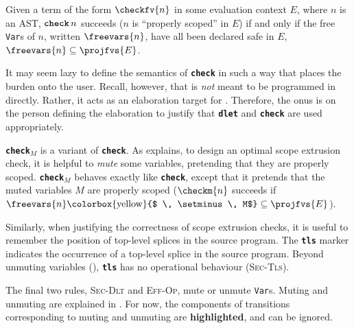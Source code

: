Given a term of the form $\checkfv{n}$ in some evaluation context $E$, where $n$ is an AST, $\textbf{\texttt{check}} \, n$ succeeds ($n$ is ``properly scoped'' in $E$) if and only if the free \texttt{Var}s of $n$, written $\freevars{n}$, have all been declared safe in $E$, $\freevars{n} \subseteq \projfvs{E}$. 

It may seem lazy to define the semantics of \textbf{\texttt{check}} in such a way that places the burden onto the user. Recall, however, that \coreLang{} is \textit{not} meant to be programmed in directly. Rather, it acts as an elaboration target for \sourceLang{}. Therefore, the onus is on the person defining the elaboration to justify that \textbf{\texttt{dlet}} and \textbf{\texttt{check}} are used appropriately. 

\textbf{\texttt{check}}$_M$ is a variant of \textbf{\texttt{check}}. As  explains, to design an optimal scope extrusion check, it is helpful to \textit{mute} some variables, pretending that they are properly scoped. \textbf{\texttt{check}}$_M$ behaves exactly like \textbf{\texttt{check}}, except that it pretends that the muted variables $M$ are properly scoped ($\checkm{n}$ succeeds if $\freevars{n} \text{\colorbox{yellow}{$ \, \setminus \, M$}} \subseteq \projfvs{E}$).

Similarly, when justifying the correctness of scope extrusion checks, it is useful to remember the position of top-level splices in the \sourceLang{} source program. The \textbf{\texttt{tls}} marker indicates the occurrence of a top-level splice in the source program. Beyond unmuting variables (), \textbf{\texttt{tls}} has no operational behaviour (\textsc{Sec-Tls}).

The final two rules, \textsc{Sec-Dlt} and \textsc{Eff-Op}, mute or unmute \texttt{Var}s. Muting and unmuting are explained in . For now, the components of transitions corresponding to muting and unmuting are \textbf{\textcolor{coreHighlight}{highlighted}}, and can be ignored. 

